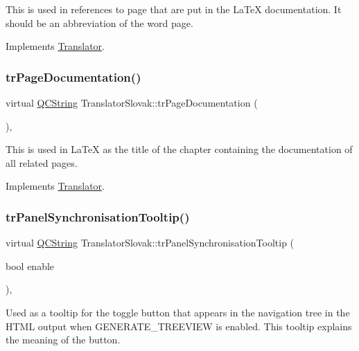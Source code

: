 This is used in references to page that are put in the La\+TeX documentation. It should be an abbreviation of the word page. 

Implements \mbox{\hyperlink{class_translator}{Translator}}.

\mbox{\label{class_translator_slovak_a8a9b4236be7f10a4f5908112904a88dd}} 
\subsubsection{\texorpdfstring{trPageDocumentation()}{trPageDocumentation()}}
{\footnotesize\ttfamily virtual \mbox{\hyperlink{class_q_c_string}{Q\+C\+String}} Translator\+Slovak\+::tr\+Page\+Documentation (\begin{DoxyParamCaption}{ }\end{DoxyParamCaption})\hspace{0.3cm}{\ttfamily [inline]}, {\ttfamily [virtual]}}

This is used in La\+TeX as the title of the chapter containing the documentation of all related pages. 

Implements \mbox{\hyperlink{class_translator}{Translator}}.

\mbox{\label{class_translator_slovak_ad4e996ad8a81a0cf7899eb0585bd0b2d}} 
\subsubsection{\texorpdfstring{trPanelSynchronisationTooltip()}{trPanelSynchronisationTooltip()}}
{\footnotesize\ttfamily virtual \mbox{\hyperlink{class_q_c_string}{Q\+C\+String}} Translator\+Slovak\+::tr\+Panel\+Synchronisation\+Tooltip (\begin{DoxyParamCaption}\item[{bool}]{enable }\end{DoxyParamCaption})\hspace{0.3cm}{\ttfamily [inline]}, {\ttfamily [virtual]}}

Used as a tooltip for the toggle button that appears in the navigation tree in the H\+T\+ML output when G\+E\+N\+E\+R\+A\+T\+E\+\_\+\+T\+R\+E\+E\+V\+I\+EW is enabled. This tooltip explains the meaning of the button. 

